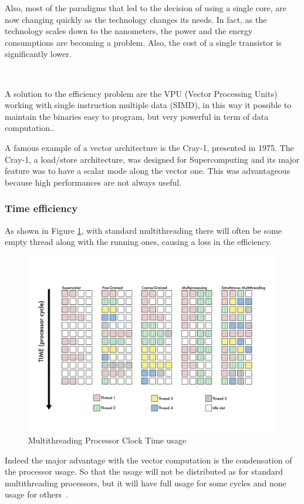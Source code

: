 Also, most of the paradigms that led to the decision of using a single core, are now changing quickly as the technology changes its needs.
In fact, as the technology scales down to the nanometers, the power and the energy consumptions are becoming a problem. Also, the cost of a single transistor is significantly lower.

\

A solution to the efficiency problem are the VPU (Vector Processing Units) working with single instruction multiple data (SIMD), in this way it possible to maintain the binaries easy to program, but very powerful in term of data computation..

A famous example of a vector architecture is the Cray-1, presented in 1975.
The Cray-1, a load/store architecture, was designed for Supercomputing and its major feature was to have a scalar mode along the vector one. This was advantageous because high performances are not always useful.

\subsubsection{Time efficiency}
As shown in Figure \ref{Multithreading}, with standard multithreading there will often be some empty thread along with the running ones, causing a loss in the efficiency.
\begin{figure}[H]
    \centering
    \includegraphics[scale = 0.5]{Chapter_1/img/threads.png}
    \caption{Multithreading Processor Clock Time usage~\cite{L15-Krste}}
    \label{Multithreading}
\end{figure}

Indeed the major advantage with the vector computation is the condensation of the processor usage. 
So that the usage will not be distributed as for standard multithreading processors, but it will have full usage for some cycles and none usage for others~\cite{L15-Krste}.

